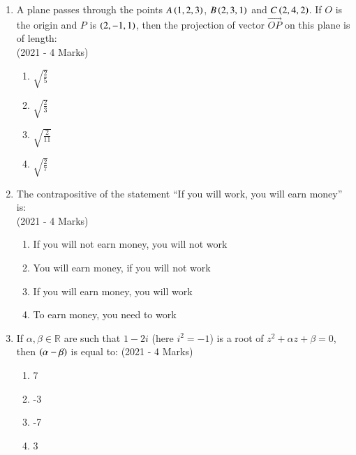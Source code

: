 \documentclass[journal]{IEEEtran}
\begin{document}
    \begin{enumerate}
    \item{
          	A plane passes through the points $A\left(1,2,3\right)$, $B\left(2,3,1\right)$ and $C\left(2,4,2\right)$. If $O$ is the origin and $P$ is $\left(2,-1,1\right)$, then the projection of vector $\overrightarrow{OP}$ on this plane is of length:\\ \text{  }\hfill
                {(2021 - 4 Marks)}
            \begin{multicols}{4}
				\begin{enumerate}
					\item $\sqrt{\frac{2}{5}}$
					
					\item $\sqrt{\frac{2}{3}}$
					
					\item $\sqrt{\frac{2}{11}}$
					
					\item $\sqrt{\frac{2}{7}}$
				\end{enumerate}
			\end{multicols}
            }
    \item{
           	The contrapositive of the statement “If you will work, you will earn money” is: \\ \text{ }\hfill
                {(2021 - 4 Marks)}
                \begin{enumerate}
                   	\item If you will not earn money, you will not work
                   	\item You will earn money, if you will not work
                   	\item If you will earn money, you will work
                   	\item To earn money, you need to work
                \end{enumerate}
        }
\item{
        	
        	If $\alpha, \beta \in \mathbb{R}$ are such that $1 - 2i$ (here $i^2 = -1$) is a root of $z^2 + \alpha z + \beta = 0$, then $\left(\alpha - \beta\right)$ is equal to:
        	\hfill
        	{(2021 - 4 Marks)}
        	\begin{multicols}{4}
        		\begin{enumerate}
        			\item 7
        			\item -3
        			\item -7
        			\item 3
        		\end{enumerate}
        	\end{multicols}
        	
}
\end{enumerate}
\end{document}
